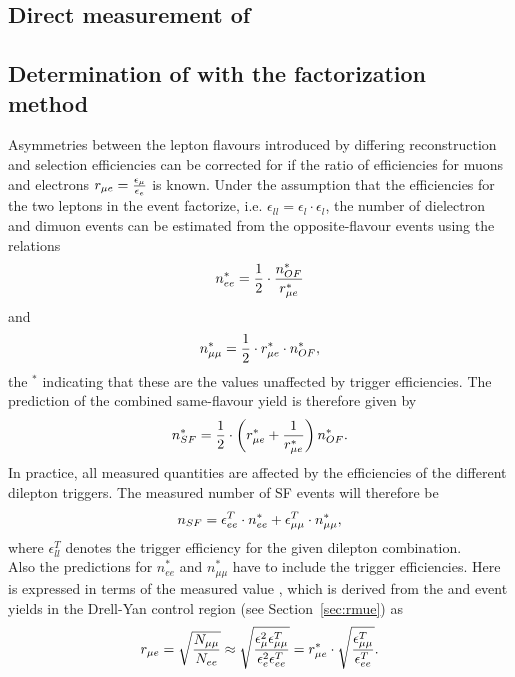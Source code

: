 \subsection{Direct measurement of \Rsfof}

\subsection{Determination of \Rsfof with the factorization method}
Asymmetries between the lepton flavours introduced by differing reconstruction and selection efficiencies can be corrected for if the ratio of efficiencies for muons and electrons $r_{\mu e} = \frac{\epsilon_{\mu}}{\epsilon_{e}}$ is known. Under the assumption that the efficiencies for the two leptons in the event factorize, i.e. $\epsilon_{ll} = \epsilon_{l}\cdot\epsilon_{l}$, the number of dielectron and dimuon events can be estimated from the opposite-flavour events using the relations
\begin{equation}
n_{ee}^{*} = \frac{1}{2}\cdot \frac{n_{OF}^{*}}{r_{\mu e}^{*}}
\end{equation}
and 
\begin{equation}
n_{\mu\mu}^{*} = \frac{1}{2} \cdot r_{\mu e}^{*} \cdot n_{OF}^{*},
\end{equation}
the $^{*}$ indicating that these are the values unaffected by trigger efficiencies.
The prediction of the combined same-flavour yield is therefore given by
\begin{equation}
n_{SF}^{*} = \frac{1}{2}\cdot \left( r_{\mu e}^{*} + \frac{1}{r_{\mu e}^{*}} \right) n_{OF}^{*}.
\end{equation}
In practice, all measured quantities are affected by the efficiencies of the different dilepton triggers. The measured number of SF events will therefore be
\begin{equation}
n_{SF} = \epsilon_{ee}^T \cdot n_{ee}^{*} + \epsilon_{\mu\mu}^T \cdot n_{\mu\mu}^{*},
\end{equation}
where $\epsilon_{ll}^T$ denotes the trigger efficiency for the given dilepton combination.\\
Also the predictions for $n_{ee}^{*}$ and $n_{\mu\mu}^{*}$ have to include the trigger efficiencies. Here \rmuestar is expressed in terms of the measured value \rmue, which is derived from the \EE and \MM event yields in the Drell-Yan control region (see Section~\ref{sec:rmue}) as 
\begin{equation}
r_{\mu e}  = \sqrt{\frac{N_{\mu\mu}}{N_{ee}}} \approx \sqrt{\frac{\epsilon_{\mu}^2 \epsilon_{\mu\mu}^T}{\epsilon_{e}^2 \epsilon_{ee}^T}} = r_{\mu e}^{*} \cdot \sqrt{\frac{\epsilon_{\mu\mu}^T}{\epsilon_{ee}^T}}.
\end{equation}
